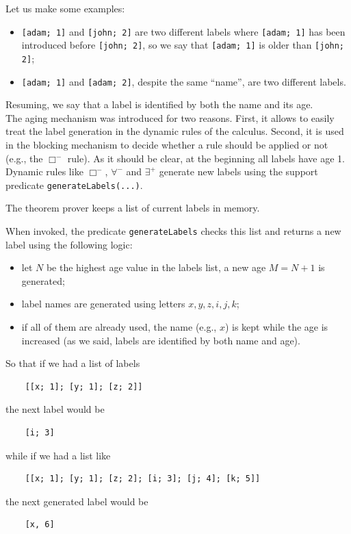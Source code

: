 \documentclass[a4paper, 11pt, oneside]{elsarticle}
\newcommand{\perogni} {\forall}
\newcommand{\esiste} {\exists}
\begin{document}
Let us make some examples:
\begin{itemize}
\item \texttt{[adam; 1]} and \texttt{[john; 2]} are two different labels where \texttt{[adam; 1]} has been introduced before \texttt{[john; 2]}, so we say that \texttt{[adam; 1]} is older than \texttt{[john; 2]};

\item \texttt{[adam; 1]} and \texttt{[adam; 2]}, despite the same ``name'', are two different labels.
\end{itemize}
Resuming, we say that a label is identified by both the name and its age.\\

The aging mechanism was introduced for two reasons.
First, it allows to easily treat the label generation in the dynamic rules of the calculus.
Second, it is used in the blocking mechanism to decide whether a rule should be applied or not (e.g., the $\Box^-$ rule).
As it should be clear, at the beginning all labels have age 1. Dynamic rules like $\Box^-$, $\perogni^-$ and $\esiste^+$ generate new labels using the support predicate \texttt{generateLabels(...)}.

The theorem prover keeps a list of current labels in memory.

When invoked, the predicate \texttt{generateLabels} checks this list and returns a new label using the following logic:
\begin{itemize}
\item let $N$ be the highest age value in the labels list, a new age $M = N + 1$ is generated;
\item label names are generated using letters $x,y,z,i,j,k$;
\item if all of them are already used, the name (e.g., $x$) is kept while the age is increased (as we said, labels are identified by both name and age).
\end{itemize}
So that if we had a list of labels
\begin{verbatim}
    [[x; 1]; [y; 1]; [z; 2]]
\end{verbatim}
the next label would be
\begin{verbatim}
    [i; 3]
\end{verbatim}
while if we had a list like
\begin{verbatim}
    [[x; 1]; [y; 1]; [z; 2]; [i; 3]; [j; 4]; [k; 5]]
\end{verbatim}
the next generated label would be
\begin{verbatim}
    [x, 6]
\end{verbatim}
\end{document}
